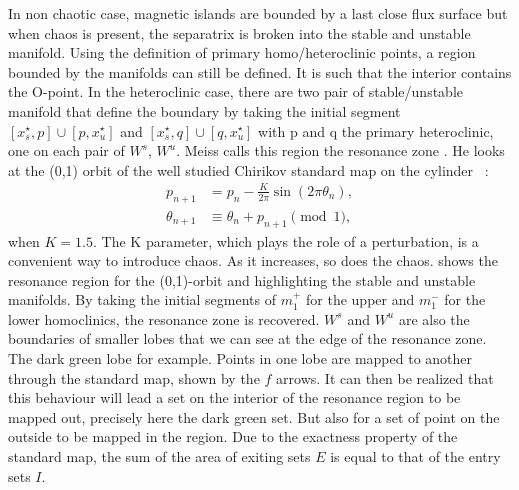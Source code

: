 In non chaotic case, magnetic islands are bounded by a last close flux surface but when chaos is present, the separatrix is broken into the stable and unstable manifold. Using the definition of primary homo/heteroclinic points, a region bounded by the manifolds can still be defined. It is such that the interior contains the O-point. In the heteroclinic case, there are two pair of stable/unstable manifold that define the boundary by taking the initial segment $[x_s^\star,p]\cup[p,x_u^\star]$
and $[x_s^\star,q]\cup[q,x_u^\star]$ with p and q the primary heteroclinic, one on each pair of $W^s$, $W^u$. Meiss calls this region the resonance zone \cite{meiss_thirty_2015}. He looks at the (0,1) orbit of the well studied Chirikov standard map on the cylinder ~:
\begin{align*}
   p_{n+1} &= p_{n} -\frac{K}{2\pi}\sin(2\pi\theta_n),\\
   \theta_{n+1} &\equiv \theta_{n} + p_{n+1} \pmod{1},
\end{align*}
when $K=1.5$. The K parameter, which plays the role of a perturbation, is a convenient way to introduce chaos. As it increases, so does the chaos.  shows the resonance region for the (0,1)-orbit and highlighting the stable and unstable manifolds. By taking the initial segments of $m_1^+$ for the upper and $m_1^-$ for the lower homoclinics, the resonance zone is recovered. $W^s$ and $W^u$ are also the boundaries of smaller lobes that we can see at the edge of the resonance zone. The dark green lobe for example. Points in one lobe are mapped to another through the standard map, shown by the $f$ arrows. It can then be realized that this behaviour will lead a set on the interior of the resonance region to be mapped out, precisely here the dark green set. But also for a set of point on the outside to be mapped in the region. Due to the exactness property of the standard map, the sum of the area of exiting sets $E$ is equal to that of the entry sets $I$.

